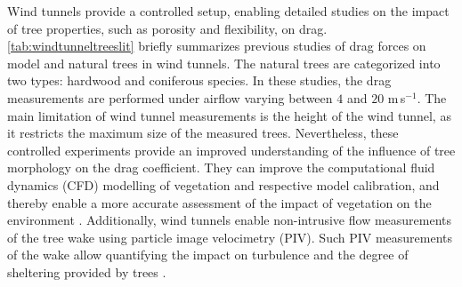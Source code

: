 Wind tunnels provide a controlled setup, enabling detailed studies on the impact of tree properties, such as porosity and flexibility, on drag. \cref{tab:windtunneltreeslit} briefly summarizes previous studies of drag forces on model and natural trees in wind tunnels. The natural trees are categorized into two types: hardwood and coniferous species. In these studies, the drag measurements are performed under airflow varying between $4$ and $20$ m\,s$^{-1}$. The main limitation of wind tunnel measurements is the height of the wind tunnel, as it restricts the maximum size of the measured trees. Nevertheless, these controlled experiments provide an improved understanding of the influence of tree morphology on the drag coefficient. They can improve the computational fluid dynamics (CFD) modelling of vegetation and respective model calibration, and thereby enable a more accurate assessment of the impact of vegetation on the environment \citep{Bitog2011,Bitog2012}. Additionally, wind tunnels enable non-intrusive flow measurements of the tree wake using particle image velocimetry (PIV). Such PIV measurements of the wake allow quantifying the impact on turbulence and the degree of sheltering provided by trees \citep{Lee2012,Lee2014565}.

{
}

